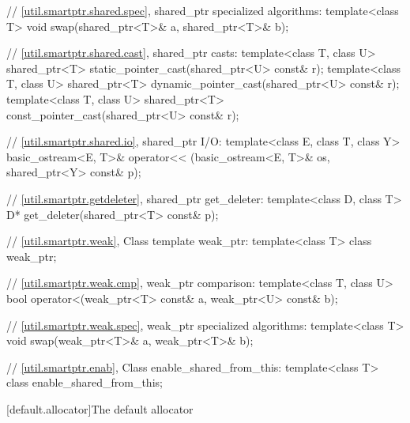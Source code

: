 \documentclass[american,twoside]{book}
\begin{document}
\begin{codeblock}
{  // \ref{util.smartptr.shared.spec}, shared_ptr specialized algorithms:
  template<class T> void swap(shared_ptr<T>& a, shared_ptr<T>& b);

  // \ref{util.smartptr.shared.cast}, shared_ptr casts:
  template<class T, class U>
    shared_ptr<T> static_pointer_cast(shared_ptr<U> const& r);
  template<class T, class U>
    shared_ptr<T> dynamic_pointer_cast(shared_ptr<U> const& r);
  template<class T, class U>
    shared_ptr<T> const_pointer_cast(shared_ptr<U> const& r);

  // \ref{util.smartptr.shared.io}, shared_ptr I/O:
  template<class E, class T, class Y>
    basic_ostream<E, T>& operator<< (basic_ostream<E, T>& os, shared_ptr<Y> const& p);

  // \ref{util.smartptr.getdeleter}, shared_ptr get_deleter:
  template<class D, class T> D* get_deleter(shared_ptr<T> const& p);

  // \ref{util.smartptr.weak}, Class template weak_ptr:
  template<class T> class weak_ptr;

  // \ref{util.smartptr.weak.cmp}, weak_ptr comparison:
  template<class T, class U> bool operator<(weak_ptr<T> const& a, weak_ptr<U> const& b);

  // \ref{util.smartptr.weak.spec}, weak_ptr specialized algorithms:
  template<class T> void swap(weak_ptr<T>& a, weak_ptr<T>& b);

  // \ref{util.smartptr.enab}, Class enable_shared_from_this:
  template<class T> class enable_shared_from_this;
}
\end{codeblock}

[default.allocator]{The default allocator}
\end{document}
